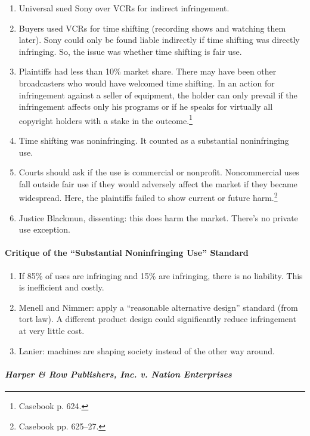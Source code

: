 \begin{enumerate}
    \item Universal sued Sony over VCRs for indirect infringement.
    \item Buyers used VCRs for time shifting (recording shows and 
    watching them later). Sony could only be found liable indirectly if time 
    shifting was directly infringing. So, the issue was whether time shifting 
    is fair use.
    \item Plaintiffs had less than 10\% market share. There may have been 
    other broadcasters who would have welcomed time shifting. In an action for 
    infringement against a seller of equipment, the holder can only prevail if 
    the infringement affects only his programs or if he speaks for virtually 
    all copyright holders with a stake in the outcome.\footnote{Casebook p. 
    624.}
    \item Time shifting was noninfringing. It counted as a substantial 
    noninfringing use. 
    \item Courts should ask if the use is commercial or nonprofit. 
    Noncommercial uses fall outside fair use if they would adversely affect 
    the market if they became widespread. Here, the plaintiffs failed to show 
    current or future harm.\footnote{Casebook pp. 625--27.}
    \item Justice Blackmun, dissenting: this does harm the market. There's no 
    private use exception.
\end{enumerate}

\paragraph{Critique of the ``Substantial Noninfringing Use'' Standard}

\begin{enumerate}
    \item If 85\% of uses are infringing and 15\% are infringing, there is no 
    liability. This is inefficient and costly.
    \item Menell and Nimmer: apply a ``reasonable alternative design'' 
    standard (from tort law). A different product design could significantly 
    reduce infringement at very little cost.
    \item Lanier: machines are shaping society instead of the other way 
    around.
\end{enumerate}

\paragraph{\emph{Harper \& Row Publishers, Inc. v. Nation Enterprises}}

